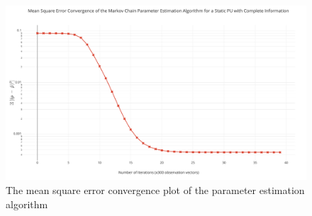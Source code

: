 \documentclass[10pt,twocolumn]{IEEEtran}
\begin{document}
\begin{figure}
    \centering
    \includegraphics[scale=0.215]{ParameterEstimatorConvergence.png}
    \caption{The mean square error convergence plot of the parameter estimation algorithm}
    \label{fig:4}
\end{figure}
\end{document}
